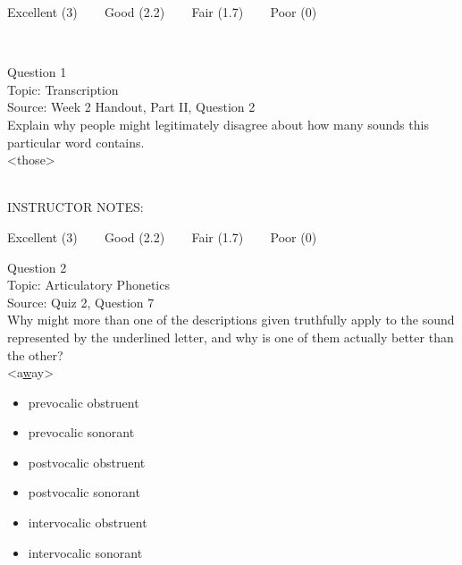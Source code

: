 \documentclass[12pt]{article}
\begin{document}
\vfill
Excellent (3) ~~~ Good (2.2) ~~~ Fair (1.7) ~~~ Poor (0)
\newpage

\begin{center}
\textbf{{\color{red}{\HUGE END OF EXAM}}}\\

\end{center}
\newpage

\begin{center}
\textbf{{\color{blue}{\HUGE START OF EXAM\\}}}

\textbf{{\color{blue}{\HUGE Student ID: 30794\\}}}

\textbf{{\color{blue}{\HUGE \\}}}

\end{center}
\newpage

{\large Question 1}\\

Topic: Transcription\\
Source: Week 2 Handout, Part II, Question 2\\

Explain why people might legitimately disagree about how many sounds this particular word contains.\\

<those>


~\\
INSTRUCTOR NOTES: 


\vfill
Excellent (3) ~~~ Good (2.2) ~~~ Fair (1.7) ~~~ Poor (0)
\newpage

{\large Question 2}\\

Topic: Articulatory Phonetics\\
Source: Quiz 2, Question 7\\

Why might more than one of the descriptions given truthfully apply to the sound represented by the underlined letter, and why is one of them actually better than the other?\\

<a\underline{w}ay>

\begin{itemize} \item prevocalic obstruent \item prevocalic sonorant \item postvocalic obstruent \item postvocalic sonorant \item intervocalic obstruent \item intervocalic sonorant \end{itemize}
\end{document}
